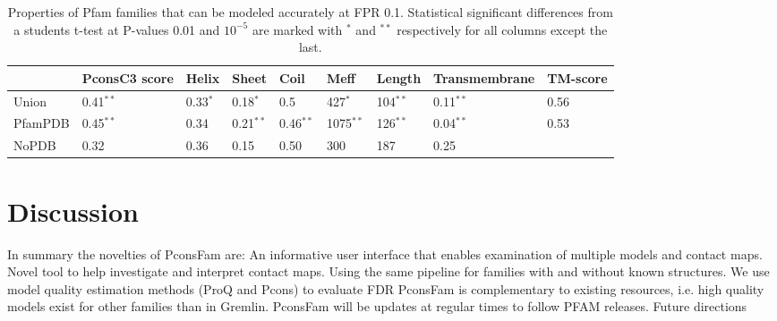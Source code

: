 \documentclass[a4,center,fleqn]{NAR}
\begin{document}
\begin{table}[tb!]
\centering
\caption{Properties of Pfam families that can be modeled accurately at FPR
0.1. Statistical significant differences
from a students t-test at P-values 0.01 and $10^{-5}$ are marked with $^*$ and
$^{**}$ respectively for all columns except the last.}

\label{tab:nopdb2}
\begin{tabular}{lllllllll}
  \hline
  & PconsC3 score & Helix & Sheet & Coil & Meff & Length & Transmembrane & TM-score\\ 
  \hline
  Union & 0.41$^{**}$ & 0.33$^{*}$ & 0.18$^{*}$ & 0.5 & 427$^*$ & 104$^{**}$ & 0.11$^{**}$ & 0.56\\ 
  PfamPDB & 0.45$^{**}$ & 0.34 & 0.21$^{**}$ & 0.46$^{**}$ & 1075$^{**}$ & 126$^{**}$ & 0.04$^{**}$ & 0.53 \\ \hline
  NoPDB & 0.32 & 0.36 & 0.15 & 0.50 & 300 & 187 & 0.25 & \\
   \hline
\end{tabular}

\end{table}



\section{Discussion}



                
In summary the novelties of PconsFam are:
An informative user interface that enables examination of multiple models and contact maps.
Novel tool to help investigate and interpret contact maps.
Using the same pipeline for families with and without known structures.
We use model quality estimation methods (ProQ and Pcons) to evaluate FDR 
PconsFam is complementary to existing resources, i.e. high quality models exist for other families than in Gremlin.
PconsFam will be updates at regular times to follow PFAM releases.
Future directions
\end{document}
